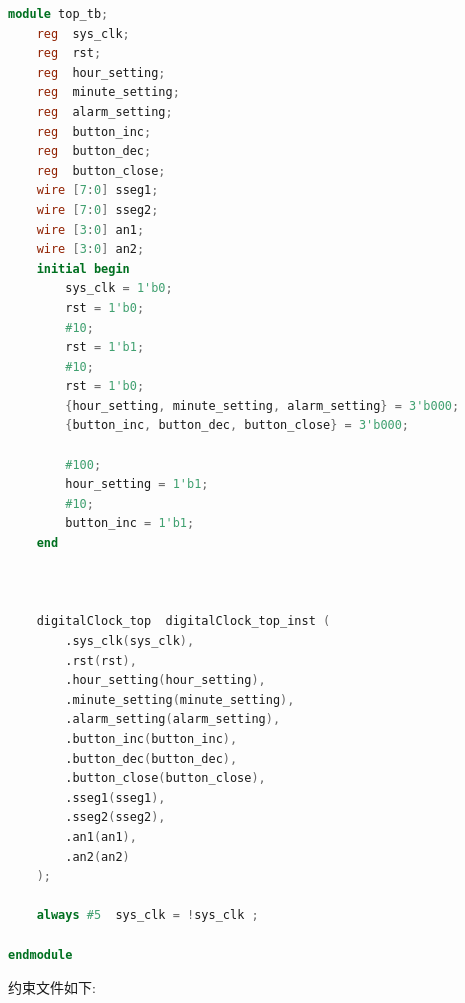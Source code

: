 \documentclass{article}
\begin{document}
\begin{lstlisting}[language=Verilog, caption={top仿真文件}]
module top_tb;
    reg  sys_clk;
    reg  rst;
    reg  hour_setting;
    reg  minute_setting;
    reg  alarm_setting;
    reg  button_inc;
    reg  button_dec;
    reg  button_close;
    wire [7:0] sseg1;
    wire [7:0] sseg2;
    wire [3:0] an1;
    wire [3:0] an2;
    initial begin
        sys_clk = 1'b0;
        rst = 1'b0;
        #10;
        rst = 1'b1;
        #10;
        rst = 1'b0;
        {hour_setting, minute_setting, alarm_setting} = 3'b000;
        {button_inc, button_dec, button_close} = 3'b000;
        
        #100;
        hour_setting = 1'b1;
        #10;
        button_inc = 1'b1;
    end



    digitalClock_top  digitalClock_top_inst (
        .sys_clk(sys_clk),
        .rst(rst),
        .hour_setting(hour_setting),
        .minute_setting(minute_setting),
        .alarm_setting(alarm_setting),
        .button_inc(button_inc),
        .button_dec(button_dec),
        .button_close(button_close),
        .sseg1(sseg1),
        .sseg2(sseg2),
        .an1(an1),
        .an2(an2)
    );

    always #5  sys_clk = !sys_clk ;

endmodule
\end{lstlisting}
约束文件如下:
\end{document}
